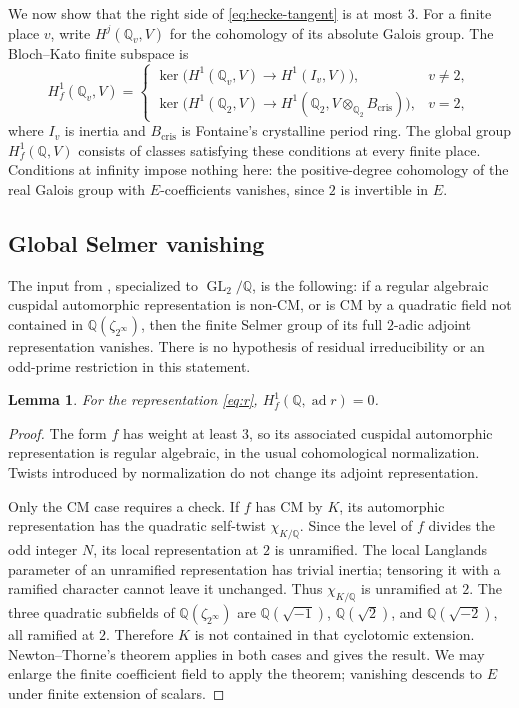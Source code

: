 \documentclass[11pt]{article}
\newtheorem{lemma}[theorem]{Lemma}
\theoremstyle{remark}
\numberwithin{equation}{section}
\newcommand{\Q}{\mathbb Q}
\DeclareMathOperator{\GL}{GL}
\DeclareMathOperator{\ad}{ad}
\begin{document}
We now show that the right side of \eqref{eq:hecke-tangent} is
at most $3$. For a finite place $v$, write
$H^j(\Q_v,V)$ for the cohomology of its absolute Galois group.
The Bloch--Kato finite subspace is
\[
 H^1_f(\Q_v,V)=
 \begin{cases}
 \ker\bigl(H^1(\Q_v,V)\to H^1(I_v,V)\bigr),&v\ne2,\\
 \ker\bigl(H^1(\Q_2,V)\to
 H^1(\Q_2,V\otimes_{\Q_2}B_{\mathrm{cris}})\bigr),&v=2,
 \end{cases}
\]
where $I_v$ is inertia and $B_{\mathrm{cris}}$ is Fontaine's
crystalline period ring. The global group $H^1_f(\Q,V)$ consists
of classes satisfying these conditions at every finite place.
Conditions at infinity impose nothing here: the positive-degree
cohomology of the real Galois group with $E$-coefficients vanishes,
since $2$ is invertible in $E$.

\subsection{Global Selmer vanishing}
The input from \cite[Theorem~5.4]{NewtonThorne23}, specialized
to $\GL_2/\Q$, is the following: if a regular algebraic cuspidal
automorphic representation is non-CM, or is CM by a quadratic
field not contained in $\Q(\zeta_{2^\infty})$, then the finite
Selmer group of its full $2$-adic adjoint representation vanishes.
There is no hypothesis of residual irreducibility or an odd-prime
restriction in this statement.

\begin{lemma}\label{lem:global-selmer}
For the representation \eqref{eq:r},
$H^1_f(\Q,\ad r)=0$.
\end{lemma}
\begin{proof}
The form $f$ has weight at least $3$, so its associated cuspidal
automorphic representation is regular algebraic, in the usual
cohomological normalization. Twists introduced by normalization
do not change its adjoint representation.

Only the CM case requires a check. If $f$ has CM by $K$, its
automorphic representation has the quadratic self-twist
$\chi_{K/\Q}$. Since the level of $f$ divides the odd integer
$N$, its local representation at $2$ is unramified. The local
Langlands parameter of an unramified representation has trivial
inertia; tensoring it with a ramified character cannot leave it
unchanged. Thus $\chi_{K/\Q}$ is unramified at $2$.
The three quadratic subfields of $\Q(\zeta_{2^\infty})$ are
$\Q(\sqrt{-1})$, $\Q(\sqrt2)$, and $\Q(\sqrt{-2})$,
all ramified at $2$. Therefore $K$ is not contained in that
cyclotomic extension. Newton--Thorne's theorem applies in both
cases and gives the result. We may enlarge the finite coefficient
field to apply the theorem; vanishing descends to $E$ under finite
extension of scalars.
\end{proof}
\end{document}
